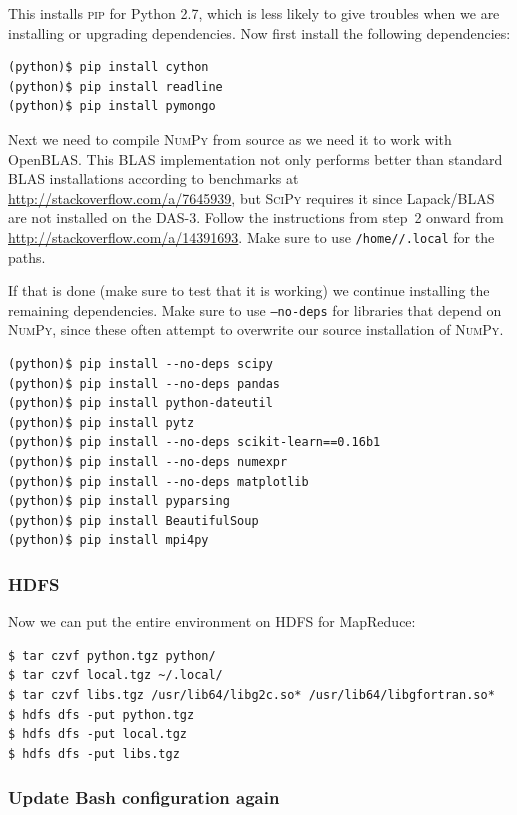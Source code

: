\documentclass{article}
\begin{document}
This installs \textsc{pip} for Python 2.7, which is less likely to give 
troubles when we are installing or upgrading dependencies. Now first install the following dependencies:

\begin{verbatim}
(python)$ pip install cython
(python)$ pip install readline
(python)$ pip install pymongo
\end{verbatim}

Next we need to compile \textsc{NumPy} from source as we need it to work with 
OpenBLAS\@. This BLAS implementation not only performs better than standard
BLAS installations according to benchmarks at 
\url{http://stackoverflow.com/a/7645939}, but \textsc{SciPy} requires it 
since Lapack/BLAS are not installed on the DAS-3. Follow the instructions 
from step~2 onward from \url{http://stackoverflow.com/a/14391693}. Make sure to 
use \texttt{/home//.local} for the paths.

If that is done (make sure to test that it is working) we continue installing 
the remaining dependencies. Make sure to use \texttt{--no-deps} for libraries 
that depend on \textsc{NumPy}, since these often attempt to overwrite our 
source installation of \textsc{NumPy}.

\begin{verbatim}
(python)$ pip install --no-deps scipy
(python)$ pip install --no-deps pandas
(python)$ pip install python-dateutil
(python)$ pip install pytz
(python)$ pip install --no-deps scikit-learn==0.16b1
(python)$ pip install --no-deps numexpr
(python)$ pip install --no-deps matplotlib
(python)$ pip install pyparsing
(python)$ pip install BeautifulSoup
(python)$ pip install mpi4py
\end{verbatim}

\subsubsection{HDFS}\label{app:hdfs}
Now we can put the entire environment on HDFS for MapReduce:

\begin{verbatim}
$ tar czvf python.tgz python/
$ tar czvf local.tgz ~/.local/
$ tar czvf libs.tgz /usr/lib64/libg2c.so* /usr/lib64/libgfortran.so*
$ hdfs dfs -put python.tgz
$ hdfs dfs -put local.tgz
$ hdfs dfs -put libs.tgz
\end{verbatim}

\subsubsection{Update Bash configuration again}\label{app:update-bashrc-again}
\end{document}
